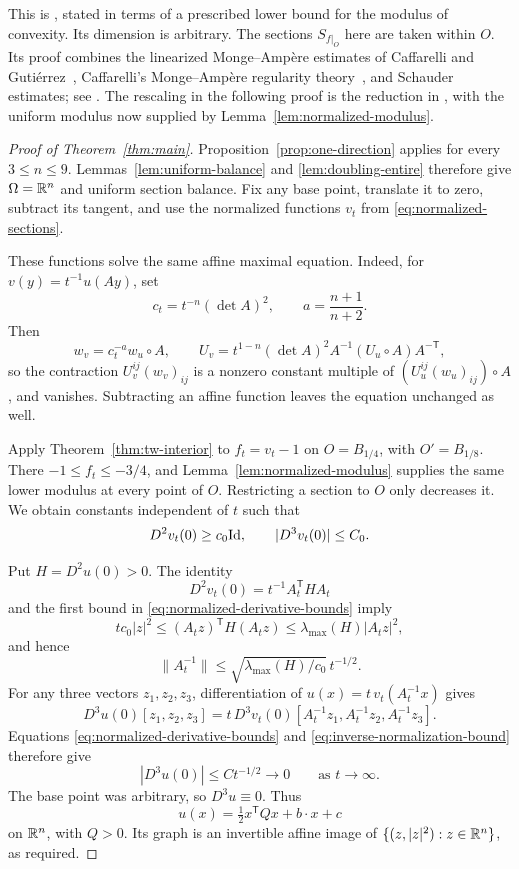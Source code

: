 This is \cite[Theorem 4.2]{TW2000}, stated in terms of a prescribed
lower bound for the modulus of convexity.  Its dimension is
arbitrary.  The sections \(S_{f|_O}\) here are taken within \(O\).
Its proof combines the linearized Monge--Amp\`ere estimates of
Caffarelli and Guti\'errez~\cite{CaffarelliGutierrez1997},
Caffarelli's Monge--Amp\`ere regularity theory~\cite{Caffarelli1990},
and Schauder estimates; see \cite[Section~4]{TW2000}.
The rescaling in the following proof is the reduction in
\cite[Theorem~2.1 and its proof]{TW2000}, with the uniform modulus now
supplied by Lemma~\ref{lem:normalized-modulus}.

\begin{proof}[Proof of Theorem~\ref{thm:main}]
Proposition~\ref{prop:one-direction} applies for every \(3\le n\le9\).
Lemmas~\ref{lem:uniform-balance} and \ref{lem:doubling-entire}
therefore give \(\Omega=\mathbb R^n\) and uniform section balance.
Fix any base point, translate it to zero, subtract its tangent, and
use the normalized functions \(v_t\) from
\eqref{eq:normalized-sections}.

These functions solve the same affine maximal equation.
Indeed, for \(v(y)=t^{-1}u(Ay)\), set
\[
 c_t=t^{-n}(\det A)^2,\qquad a=\frac{n+1}{n+2}.
\]
Then
\[
 w_v=c_t^{-a}w_u\circ A,\qquad
 U_v=t^{1-n}(\det A)^2 A^{-1}(U_u\circ A)A^{-\mathsf T},
\]
so the contraction \(U_v^{ij}(w_v)_{ij}\) is a nonzero constant
multiple of \((U_u^{ij}(w_u)_{ij})\circ A\), and vanishes.
Subtracting an affine function leaves the equation unchanged as well.

Apply Theorem~\ref{thm:tw-interior} to \(f_t=v_t-1\) on
\(O=B_{1/4}\), with \(O'=B_{1/8}\).
There \(-1\le f_t\le-3/4\), and
Lemma~\ref{lem:normalized-modulus} supplies the same lower modulus
at every point of \(O\).  Restricting a section to \(O\) only
decreases it.  We obtain constants independent of \(t\) such that
\begin{equation}\label{eq:normalized-derivative-bounds}
 D^2v_t(0)\ge c_0\mathrm{Id},\qquad |D^3v_t(0)|\le C_0.
\end{equation}

Put \(H=D^2u(0)>0\).  The identity
\[
 D^2v_t(0)=t^{-1}A_t^{\mathsf T}HA_t
\]
and the first bound in \eqref{eq:normalized-derivative-bounds} imply
\[
 t c_0|z|^2
 \le (A_tz)^{\mathsf T}H(A_tz)
 \le\lambda_{\max}(H)|A_tz|^2,
\]
and hence
\begin{equation}\label{eq:inverse-normalization-bound}
 \|A_t^{-1}\|
 \le\sqrt{\lambda_{\max}(H)/c_0}\,t^{-1/2}.
\end{equation}
For any three vectors \(z_1,z_2,z_3\), differentiation of
\(u(x)=t\,v_t(A_t^{-1}x)\) gives
\[
 D^3u(0)[z_1,z_2,z_3]
 =t\,D^3v_t(0)
       [A_t^{-1}z_1,A_t^{-1}z_2,A_t^{-1}z_3].
\]
Equations \eqref{eq:normalized-derivative-bounds} and
\eqref{eq:inverse-normalization-bound} therefore give
\[
 |D^3u(0)|\le Ct^{-1/2}\longrightarrow0
 \qquad\text{as }t\longrightarrow\infty.
\]
The base point was arbitrary, so \(D^3u\equiv0\).  Thus
\[
 u(x)=\tfrac12 x^{\mathsf T}Qx+b\cdot x+c
\]
on \(\mathbb R^n\), with \(Q>0\).
Its graph is an invertible affine image of
\(\{(z,|z|^2):z\in\mathbb R^n\}\), as required.
\end{proof}

